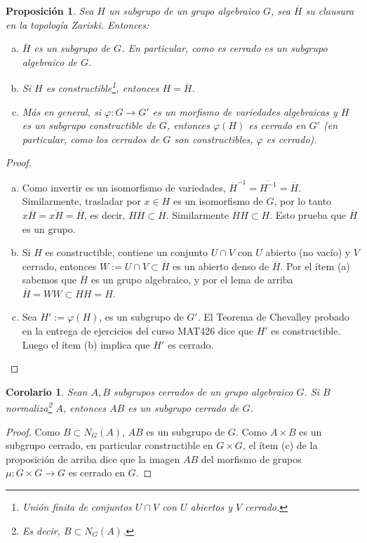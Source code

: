 \documentclass[spanish,10pt]{amsart}
\newtheorem{corollary}[theorem]{Corolario}
\newtheorem{proposition}[theorem]{Proposición}
\theoremstyle{definition}
\theoremstyle{remark}
\numberwithin{equation}{section}
\renewcommand{\bar}[1]{\overline{#1}}
\begin{document}
\begin{proposition}
Sea $H$ un subgrupo de un grupo algebraico $G$, sea $\bar H$ su clausura en la topología Zariski. Entonces:
\begin{enumerate}[(a)]
\item $\bar H$ es un subgrupo de $G$. En particular, como es cerrado es un subgrupo algebraico de $G$.
\item Si $H$ es \textit{constructible}\footnote{Unión finita de conjuntos $U \cap V$ con $U$ abiertos y $V$ cerrado.}, entonces $H = \bar H$.
\item Más en general, si $\varphi : G \to G'$ es un morfismo de variedades algebraicas y $H$ es un subgrupo constructible de $G$, entonces $\varphi (H)$ es cerrado en $G'$ (en particular, como los cerrados de $G$ son constructibles, $\varphi$ es \textit{cerrado}).
\end{enumerate}
\end{proposition}
\begin{proof}
\begin{enumerate}[(a)]
\item Como invertir es un isomorfismo de variedades, $\bar H ^{-1} = \bar{H^{-1}} = \bar H$. Similarmente, trasladar por $x \in H$ es un isomorfismo de $G$, por lo tanto $x \bar H = \bar{x H} = \bar H$, es decir, $H \bar H \subset \bar H$. Similarmente $\bar H H \subset H$. Esto prueba que $\bar H$ es un grupo.
\item Si $H$ es constructible, contiene un conjunto $U \cap V$ con $U$ abierto (no vacío) y $V$ cerrado, entonces $W := U \cap V \subset \bar H$ es un abierto denso de $\bar H$. Por el ítem (a) sabemos que $\bar H$ es un grupo algebraico, y por el lema de arriba $\bar H = W W \subset H H = H$.
\item Sea $H' := \varphi (H)$, es un subgrupo de $G'$. El Teorema de Chevalley probado en la entrega de ejercicios del curso MAT426 dice que $H'$ es constructible. Luego el ítem (b) implica que $H'$ es cerrado.
\end{enumerate}
\end{proof}

\begin{corollary}
Sean $A,B$ subgrupos cerrados de un grupo algebraico $G$. Si $B$ \textit{normaliza}\footnote{Es decir, $B \subset N_G (A)$.} $A$, entonces $AB$ es un subgrupo cerrado de $G$.
\end{corollary}
\begin{proof}
Como $B \subset N_G (A)$, $AB$ es un subgrupo de $G$. Como $A \times B$ es un subgrupo cerrado, en particular constructible en $G \times G$, el ítem (c) de la proposición de arriba dice que la imagen $AB$ del morfismo de grupos $\mu : G \times G \to G$ es cerrado en $G$.
\end{proof}
\end{document}
